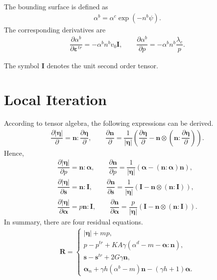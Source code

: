 \documentclass[11pt,fleqn]{article}
\newcommand*{\pfrac}[2]{\dfrac{\partial#1}{\partial#2}}
\begin{document}
The bounding surface is defined as
\begin{gather*}
\alpha^b=\alpha^c\exp\left(-n^b\psi\right).
\end{gather*}
The corresponding derivatives are
\begin{gather*}
\pfrac{\alpha^b}{\mathbold{\varepsilon}^{tr}}=-\alpha^bn^bv_0\mathbold{I},\qquad
\pfrac{\alpha^b}{p}=-\alpha^bn^b\dfrac{\lambda_c}{p}.
\end{gather*}

The symbol $\mathbold{I}$ denotes the unit second order tensor.
\section{Local Iteration}
According to tensor algebra, the following expressions can be derived.
\begin{gather*}
\pfrac{|\mathbold{\eta}|}{}=\mathbold{n}:\pfrac{\mathbold{\eta}}{},\qquad
\pfrac{\mathbold{n}}{}=\dfrac{1}{|\mathbold{\eta}|}\left(\pfrac{\mathbold{\eta}}{}-\mathbold{n}\otimes\left(\mathbold{n}:\pfrac{\mathbold{\eta}}{}\right)\right).
\end{gather*}
Hence,
\begin{gather*}
\pfrac{|\mathbold{\eta}|}{p}=\mathbold{n}:\mathbold{\alpha},\qquad
\pfrac{\mathbold{n}}{p}=\dfrac{1}{|\mathbold{\eta}|}\left(\mathbold{\alpha}-\left(\mathbold{n}:\mathbold{\alpha}\right)\mathbold{n}\right),\\
\pfrac{|\mathbold{\eta}|}{\mathbold{s}}=\mathbold{n}:\mathbf{I},\qquad
\pfrac{\mathbold{n}}{\mathbold{s}}=\dfrac{1}{|\mathbold{\eta}|}\left(\mathbf{I}-\mathbold{n}\otimes\left(\mathbold{n}:\mathbf{I}\right)\right),\\
\pfrac{|\mathbold{\eta}|}{\mathbold{\alpha}}=p\mathbold{n}:\mathbf{I},\qquad
\pfrac{\mathbold{n}}{\mathbold{\alpha}}=\dfrac{p}{|\mathbold{\eta}|}\left(\mathbf{I}-\mathbold{n}\otimes\left(\mathbold{n}:\mathbf{I}\right)\right).
\end{gather*}
In summary, there are four residual equations.
\begin{gather*}
\mathbold{R}=\left\{\begin{array}{l}
|\mathbold{\eta}|+mp,\\[3mm]
p-p^{tr}+KA\gamma\left(\alpha^d-m-\mathbold{\alpha}:\mathbold{n}\right),\\[3mm]
\mathbold{s}-\mathbold{s}^{tr}+2G\gamma\mathbold{n},\\[3mm]
\mathbold{\alpha}_n+\gamma{}h\left(\alpha^b-m\right)\mathbold{n}-\left(\gamma{}h+1\right)\mathbold{\alpha}.
\end{array}\right.
\end{gather*}
\end{document}
